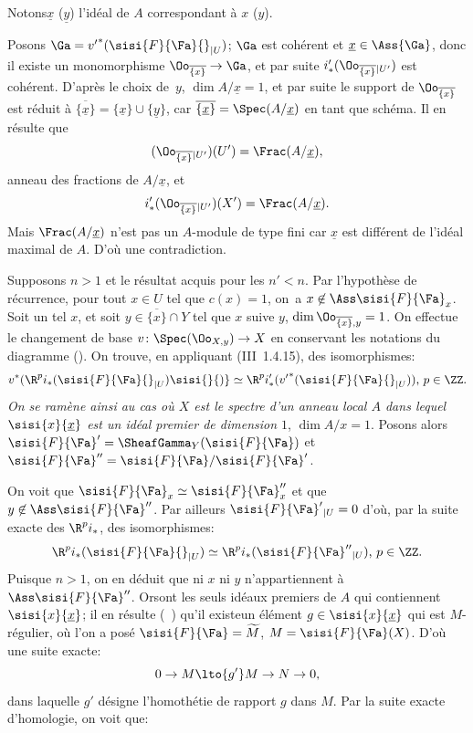 Notons\pageoriginale $\underline x$ (\resp $\underline y$) l'id\'eal de $A$ correspondant \`a $x$ (\resp $y$).

Posons ${\Ga}={v'}^\ast(\sisi{F}{{\Fa}}{}_{|U})$; ${\Ga}$ est coh\'erent et $\underline{x}\in\Ass {\Ga}$, donc il existe un monomorphisme $\Oo_{\overline{\{x\}}}\to {\Ga}$, et par suite $i'_\ast(\Oo_{\overline{\{x\}}}{}_{|U'})$ est coh\'erent. D'apr\`es le choix de~$y$, $\dim A/\underline x=1$, et par suite le support de $\Oo_{\overline{\{x\}}}$ est r\'eduit \`a $\overline{\{\underline x\}}= \{\underline x\}\cup \{\underline y\}$, car $\overline{\{\underline x\}}= \Spec(A/\underline x)$ en tant que sch\'ema. Il en r\'esulte que
\[(\Oo_{\overline{\{x\}}}{}_{|U'})(U')=\Frac (A/\underline x), \]
anneau des fractions de $A/\underline x$, et
\[i'_\ast(\Oo_{\overline{\{x\}}}{}_{|U'})(X')=\Frac(A/\underline x).
\]
Mais $\Frac(A/\underline x)$ n'est pas un $A$-module de type fini car $\underline x$ est diff\'erent de l'id\'eal maximal de $A$. D'o\`u une contradiction.

Supposons $n>1$ et le r\'esultat acquis pour les $n'<n$. Par l'hypoth\`ese de r\'ecurrence, pour tout $x\in U$ tel que $c(x)=1$, on~a $x\not\in\Ass\sisi{F}{{\Fa}}_x$. Soit un tel $x$, et soit $y\in\overline{\{x\}}\cap Y$ tel que $x$ suive $y$, \ie $\dim\Oo_{\overline{\{x\}}, y}=1$. On effectue le changement de base $v\colon\Spec (\Oo_{X, y})\to X$ en conservant les notations du diagramme (). On trouve, en appliquant (\EGA III~1.4.15), des isomorphismes:
\[v^\ast(\R^pi_\ast(\sisi{F}{{\Fa}}{}_{|U})\sisi{}{)} \simeq \R^pi'_\ast({v'}^\ast(\sisi{F}{{\Fa}}{}_{|U}))\text{, }p\in\ZZ.
\]
\sisi{}{\indent}\emph{On se ram\`ene ainsi au cas o\`u $X$ est le spectre d'un anneau local $A$ dans lequel $\sisi{x}{\underline{x}}$ est un id\'eal premier de dimension $1$}, \ie $\dim A/x=1$. Posons alors $\sisi{F}{{\Fa}}'=\SheafGamma_Y(\sisi{F}{{\Fa}})$ et $\sisi{F}{{\Fa}}''=\sisi{F}{{\Fa}}/\sisi{F}{{\Fa}}'$.

\noindent On voit que $\sisi{F}{{\Fa}}_x\simeq \sisi{F}{{\Fa}}''_x$ et que $y\not\in \Ass\sisi{F}{{\Fa}}''$. Par ailleurs $\sisi{F}{{\Fa}}'{}_{|U}=0$ d'o\`u, par la suite exacte des $\R^pi_\ast$, des isomorphismes:
\[
\R^pi_\ast(\sisi{F}{{\Fa}}{}_{|U})\simeq \R^pi_\ast(\sisi{F}{{\Fa}}''{}_{|U})\text{, }p\in\ZZ.
\]
Puisque $n>1$, on en d\'eduit que ni $x$ ni $y$ n'appartiennent \`a $\Ass \sisi{F}{{\Fa}}''$. Orsont les seuls id\'eaux premiers de $A$ qui contiennent $\sisi{x}{\underline{x}}$; il en r\'esulte (~) qu'il existe\pageoriginale un \'el\'ement $g\in \sisi{x}{\underline{x}}$ qui est $M$-r\'egulier, o\`u l'on a pos\'e $\sisi{F}{{\Fa}}=\widetilde{M}$, $M=\sisi{F}{{\Fa}}(X)$. D'o\`u une suite exacte:
\[0\to M\lto{g'} M\to N \to 0,
\]
dans laquelle $g'$ d\'esigne l'homoth\'etie de rapport $g$ dans $M$. Par la suite exacte d'homologie, on voit que:

